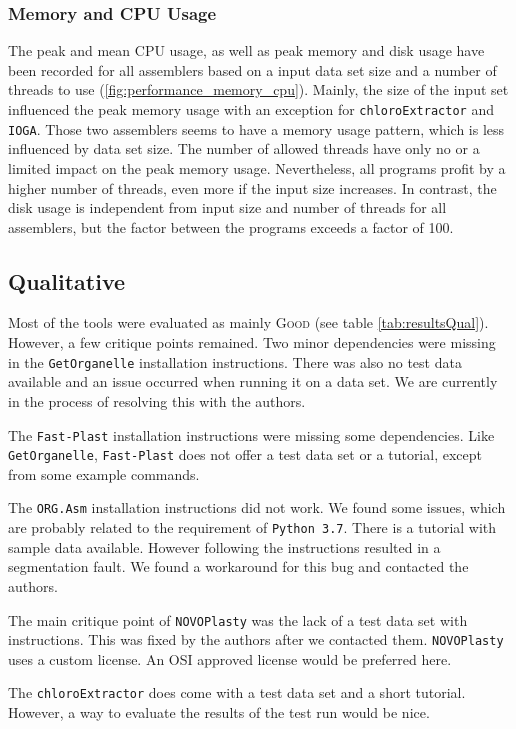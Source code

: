 \documentclass{bmcart}
\newcommand{\formatprogramnames}[1]{\texttt{#1}}
\newcommand{\ce}{\formatprogramnames{chloroExtractor}}
\newcommand{\oa}{\formatprogramnames{ORG.Asm}}
\newcommand{\fp}{\formatprogramnames{Fast-Plast}}
\newcommand{\ioga}{\formatprogramnames{IOGA}}
\newcommand{\np}{\formatprogramnames{NOVOPlasty}}
\newcommand{\go}{\formatprogramnames{GetOrganelle}}
\newcommand{\good}{\textsc{Good}}
\begin{document}
\subsubsection*{Memory and CPU Usage }
The peak and mean CPU usage, as well as peak memory and disk usage have been recorded for all assemblers based on a input data set size and a number of threads to use (\cref{fig:performance_memory_cpu}).
Mainly, the size of the input set influenced the peak memory usage with an exception for \ce{} and \ioga{}.
Those two assemblers seems to have a memory usage pattern, which is less influenced by data set size.
The number of allowed threads have only no or a limited impact on the peak memory usage.
Nevertheless, all programs profit by a higher number of threads, even more if the input size increases.
In contrast, the disk usage is independent from input size and number of threads for all assemblers, but the factor between the programs exceeds a factor of \num{100}.

\subsection*{Qualitative}
Most of the tools were evaluated as mainly \good{} (see table \ref{tab:resultsQual}). However, a few critique points remained.
Two minor dependencies were missing in the \go{} installation instructions. There was also no test data available and an issue occurred when running it on a  data set. We are currently in the process of resolving this with the authors.

The \fp{} installation instructions were missing some dependencies. Like \go{}, \fp{} does not offer a test data set or a tutorial, except from some example commands. 

The \oa{} installation instructions did not work. We found some issues, which are probably related to the requirement of \texttt{Python~3.7}. There is a tutorial with sample data available. However following the instructions resulted in a segmentation fault. We found a workaround for this bug and contacted the authors.

The main critique point of \np{} was the lack of a test data set with instructions. This was fixed by the authors after we contacted them. \np{} uses a custom license. An OSI approved license would be preferred here.

The \ce{} does come with a test data set and a short tutorial. However, a way to evaluate the results of the test run would be nice.
\end{document}
